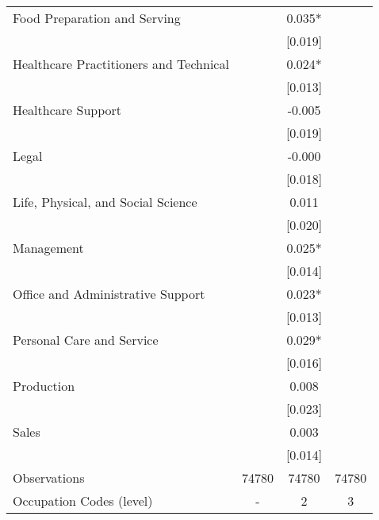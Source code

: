 \documentclass[10pt,letterpaper,subeqn]{beamer}
\begin{document}
\begin{frame}
\begin{table}[htbp]
{\begin{tabular}{l*{3}{c}}
Food Preparation and Serving &               &       0.035*  &               \\
                    &               &     [0.019]   &               \\
Healthcare Practitioners and Technical &               &       0.024*  &               \\
                    &               &     [0.013]   &               \\
Healthcare Support &               &      -0.005   &               \\
                    &               &     [0.019]   &               \\
Legal &               &      -0.000   &               \\
                    &               &     [0.018]   &               \\
Life, Physical, and Social Science &               &       0.011   &               \\
                    &               &     [0.020]   &               \\
Management &               &       0.025*  &               \\
                    &               &     [0.014]   &               \\
Office and Administrative Support &               &       0.023*  &               \\
                    &               &     [0.013]   &               \\
Personal Care and Service &               &       0.029*  &               \\
                    &               &     [0.016]   &               \\
Production &               &       0.008   &               \\
                    &               &     [0.023]   &               \\
Sales &               &       0.003   &               \\
                    &               &     [0.014]   &               \\
\midrule
Observations        &       74780   &       74780   &       74780   \\
Occupation Codes (level) &-&2&3\\

\end{tabular}}
\end{table}
\end{frame}
\end{document}
